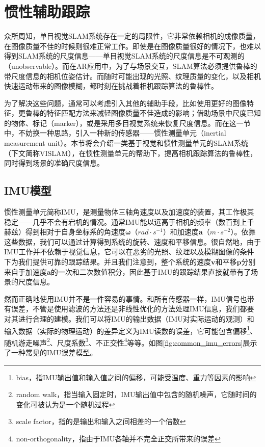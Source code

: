 \section{惯性辅助跟踪}

众所周知，单目视觉SLAM系统存在一定的局限性，它非常依赖相机的成像质量，在图像质量不佳的时候则很难正常工作。即使是在图像质量很好的情况下，也难以得到SLAM系统的尺度信息——单目视觉SLAM系统的尺度信息是不可观测的（unobservable）。而在AR应用中，为了与场景交互，SLAM算法必须提供鲁棒的带尺度信息的相机位姿估计。而随时可能出现的光照、纹理质量的变化，以及相机快速运动带来的图像模糊，都时刻在挑战着相机跟踪算法的鲁棒性。

为了解决这些问题，通常可以考虑引入其他的辅助手段，比如使用更好的图像特征，更鲁棒的特征匹配方法来减轻图像质量不佳造成的影响；借助场景中尺度已知的物体、标记（marker），或是采用多目视觉系统来恢复尺度信息。而在这一节中，不妨换一种思路，引入一种新的传感器——惯性测量单元（inertial measurement unit）。本节将会介绍一类基于视觉和惯性测量单元的SLAM系统（下文简称VISLAM），在惯性测量单元的帮助下，提高相机跟踪算法的鲁棒性，同时得到场景的准确尺度信息。

\subsection{IMU模型}

惯性测量单元简称IMU，是测量物体三轴角速度以及加速度的装置，其工作极其稳定——几乎不会有宕机的情况。通常IMU能以远高于相机的频率（数百到上千赫兹）得到相对于自身坐标系的角速度$\bm\omega$（$rad \cdot s^{-1}$）和加速度$\mathbf{a}$（$m \cdot s^{-2}$）。依靠这些数据，我们可以通过计算得到系统的旋转、速度和平移信息。很自然地，由于IMU工作并不依赖于视觉信息，它可以在恶劣的光照、纹理以及模糊图像的条件下为我们提供可靠的跟踪结果。并且我们注意到，整个系统的速度$\mathbf{v}$和平移$\mathbf{p}$分别来自于加速度$\mathbf{a}$的一次和二次数值积分，因此基于IMU的跟踪结果直接就带有了场景的尺度信息。

然而正确地使用IMU并不是一件容易的事情。和所有传感器一样，IMU信号也带有误差，不管是使用滤波的方法还是非线性优化的方法处理IMU信息，我们都要对其进行合理的建模。我们可以将IMU的输出数据（IMU对实际运动的观测）和输入数据（实际的物理运动）的差异定义为IMU读数的误差，它可能包含偏移\footnote{bias，指IMU输出值和输入值之间的偏移，可能受温度、重力等因素的影响}、随机游走噪声\footnote{random walk，指当输入固定时，IMU输出值中包含的随机噪声，它随时间的变化可被认为是一个随机过程}、尺度系数\footnote{scale factor，指的是输出和输入之间相差的一个倍数}、不正交性\footnote{non-orthogonality，指由于IMU各轴并不完全正交所带来的误差}等等\citep[see][]{imu2014}。如图\ref{fig:common_imu_errors}展示了一种常见的IMU误差模型。


